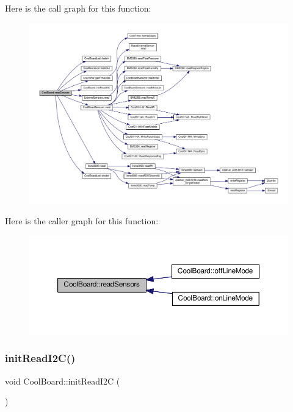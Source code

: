 Here is the call graph for this function\+:
\nopagebreak
\begin{figure}[H]
\begin{center}
\leavevmode
\includegraphics[width=350pt]{d7/df9/class_cool_board_ad03abdce2e65f520bbf2cff0f2d083cf_cgraph}
\end{center}
\end{figure}
Here is the caller graph for this function\+:
\nopagebreak
\begin{figure}[H]
\begin{center}
\leavevmode
\includegraphics[width=350pt]{d7/df9/class_cool_board_ad03abdce2e65f520bbf2cff0f2d083cf_icgraph}
\end{center}
\end{figure}
\mbox{\label{class_cool_board_a397b46fadab8f530a8cf4d914c561366}} 
\subsubsection{\texorpdfstring{init\+Read\+I2\+C()}{initReadI2C()}}
{\footnotesize\ttfamily void Cool\+Board\+::init\+Read\+I2C (\begin{DoxyParamCaption}{ }\end{DoxyParamCaption})}

